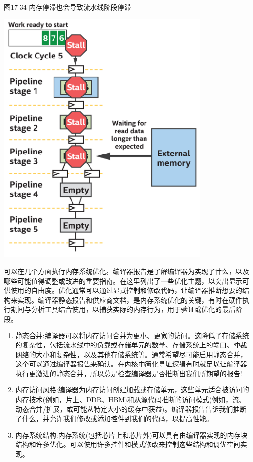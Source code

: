 \hspace*{\fill} \par %
图17-34 内存停滞也会导致流水线阶段停滞
\begin{center}
	\includegraphics[width=0.8\textwidth]{content/chapter-17/images/26}
\end{center}

可以在几个方面执行内存系统优化。编译器报告是了解编译器为实现了什么，以及哪些可能值得调整或改进的重要指南。在这里列出了一些优化主题，以突出显示可供使用的自由度。优化通常可以通过显式控制和修改代码，让编译器推断想要的结构来实现。编译器静态报告和供应商文档，是内存系统优化的关键，有时在硬件执行期间与分析工具结合使用，以捕获实际的内存行为，用于验证或优化的最后阶段。\par

\begin{enumerate}
	\item 静态合并:编译器可以将内存访问合并为更小、更宽的访问。这降低了存储系统的复杂性，包括流水线中的负载或存储单元的数量、存储系统上的端口、仲裁网络的大小和复杂性，以及其他存储系统等。通常希望尽可能启用静态合并，这个可以通过编译器报告来确认。在内核中简化寻址逻辑有时就足以让编译器执行更激进的静态合并，所以总是检查编译器是否推断出我们所期望的报告!
	\item 内存访问风格:编译器为内存访问创建加载或存储单元，这些单元适合被访问的内存技术(例如，片上、DDR、HBM)和从源代码推断的访问模式(例如，流、动态合并/扩展，或可能从特定大小的缓存中获益)。编译器报告告诉我们推断了什么，并允许我们修改或添加控件到我们的代码，以提高性能。
	\item 内存系统结构:内存系统(包括芯片上和芯片外)可以具有由编译器实现的内存块结构和许多优化。可以使用许多控件和模式修改来控制这些结构和调优空间实现。
\end{enumerate}
















